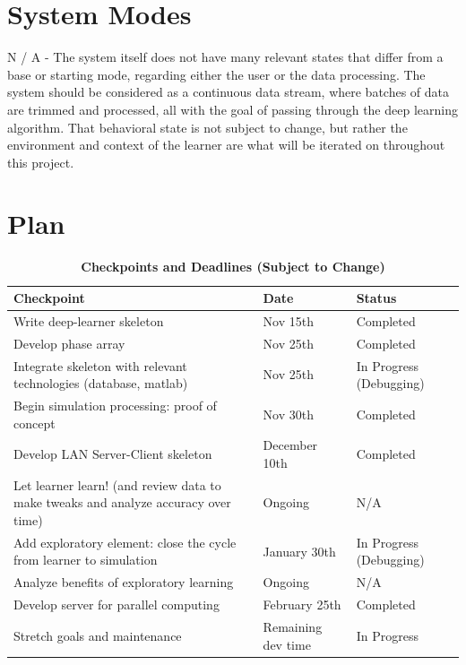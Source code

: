 \documentclass[12pt, titlepage]{article}
\begin{document}
\section{System Modes}
N / A - The system itself does not have many relevant states that differ from a base or starting mode, regarding either the user or the data processing. The system should be considered as a continuous data stream, where batches of data are trimmed and processed, all with the goal of passing through the deep learning algorithm. That behavioral state is not subject to change, but rather the environment and context of the learner are what will be iterated on throughout this project.

\section{Plan}

\begin{table}[H]
\centering
\caption{\bf Checkpoints and Deadlines (Subject to Change)}
\begin{tabular}{ |p{6cm}|p{3cm}|p{3cm}|  } 
 \hline
\bf Checkpoint & \bf Date & Status\\
 \hline
Write deep-learner skeleton & Nov 15th & Completed\\
 \hline
Develop phase array & Nov 25th & Completed\\
 \hline
Integrate skeleton with relevant technologies (database, matlab) & Nov 25th & In Progress (Debugging)\\
  \hline
Begin simulation processing: proof of concept & Nov 30th & Completed\\
\hline
Develop LAN Server-Client skeleton & December 10th & Completed\\
\hline
Let learner learn! (and review data to make tweaks and analyze accuracy over time) & Ongoing & N/A\\
\hline
Add exploratory element: close the cycle from learner to simulation & January 30th & In Progress (Debugging)\\
\hline
Analyze benefits of exploratory learning & Ongoing & N/A\\
\hline
Develop server for parallel computing & February 25th & Completed\\
\hline
Stretch goals and maintenance & Remaining dev time & In Progress\\
\hline
\end{tabular}
\end{table}
\end{document}

